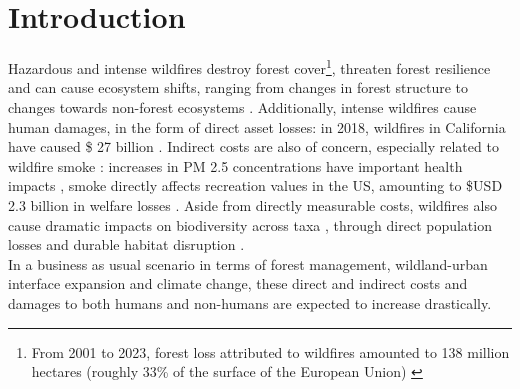 \vfill
\newpage



\section{Introduction}
\hspace*{1.5em}Hazardous and intense wildfires destroy forest cover\footnote{From 2001 to 2023, forest loss attributed to wildfires amounted to 138 million hectares (roughly 33\% of the surface of the European Union) \citep{tyukavina_global_2022}}, threaten forest resilience and can cause ecosystem shifts, ranging from changes in forest structure to changes towards non-forest ecosystems \citep{coop_wildfire-driven_2020}. 
Additionally, intense wildfires cause human damages, in the form of direct asset losses: in 2018, wildfires in California have caused \$ 27 billion \citep{wang_economic_2021}. Indirect costs are also of concern, especially related to wildfire smoke : increases in PM 2.5 concentrations have important health impacts \citep{burke_wildfire_2023, heft-neal_behavior_2023}, smoke directly affects recreation values in the US, amounting to \$USD 2.3 billion in welfare losses \citep{Gellman}. Aside from directly measurable costs, wildfires also cause dramatic impacts on biodiversity across taxa \citep{Wintle2020}, through direct population losses and durable habitat disruption \citep{Ayars2023}.
%
\\
\hspace*{1.5em}In a business as usual scenario in terms of forest management, wildland-urban interface expansion and climate change, these direct and indirect costs and damages to both humans and non-humans are expected to increase drastically.
%
\\
